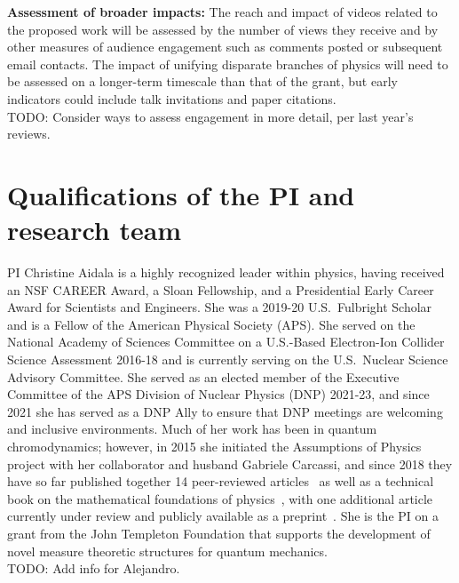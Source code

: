 \noindent
\textbf{Assessment of broader impacts:}  The reach and impact of videos related to the proposed work will be assessed by the number of views they receive and by other measures of audience engagement such as comments posted or subsequent email contacts.  The impact of unifying disparate branches of physics will need to be assessed on a longer-term timescale than that of the grant, but early indicators could include talk invitations and paper citations. \\
TODO: Consider ways to assess engagement in more detail, per last year's reviews.


\section{Qualifications of the PI and research team}
PI Christine Aidala is a highly recognized leader within physics, having received an NSF CAREER Award, a Sloan Fellowship, and a Presidential Early Career Award for Scientists and Engineers. She was a 2019-20 U.S.~Fulbright Scholar and is a Fellow of the American Physical Society (APS).  She served on the National Academy of Sciences Committee on a U.S.-Based Electron-Ion Collider Science Assessment 2016-18 and is currently serving on the U.S.~Nuclear Science Advisory Committee.  She served as an elected member of the Executive Committee of the APS Division of Nuclear Physics (DNP) 2021-23, and since 2021 she has served as a DNP Ally to ensure that DNP meetings are welcoming and inclusive environments.  Much of her work has been in quantum chromodynamics; however, in 2015 she initiated the Assumptions of Physics project with her collaborator and husband Gabriele Carcassi, and since 2018 they have so far published together 14 peer-reviewed articles~\cite{aop-phys-blueprint,aop-topExpDisting,aop-HamQuantInfo,Carcassi:2021,aop-spacetimeStruct,aop-HamConsInfoEnt,Carcassi2021four,Carcassi:2022bpm,aop-HamPriv,aop-commonLogical,aop-action,aop-nogo,aop-nonaddmeas,aop-unphysHilbert} as well as a technical book on the mathematical foundations of physics~\cite{aop-book}, with one additional article currently under review and publicly available as a preprint~\cite{aop-classicallimit}.  She is the PI on a grant from the John Templeton Foundation that supports the development of novel measure theoretic structures for quantum mechanics. \\

TODO: Add info for Alejandro.


